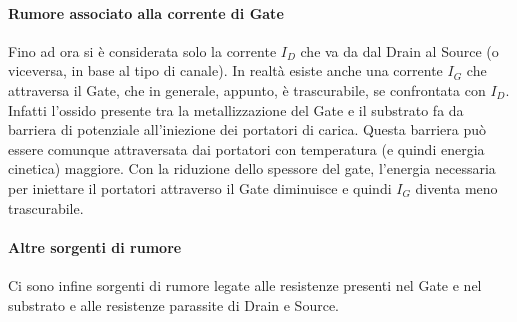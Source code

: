 \paragraph*{Rumore associato alla corrente di Gate}
Fino ad ora si è considerata solo la corrente $I_D$ che va da dal Drain al Source (o viceversa, in base al tipo di canale). In realtà esiste anche una corrente $I_G$ che attraversa il Gate, che in generale, appunto, è trascurabile, se confrontata con  $I_D$. Infatti l'ossido presente tra la metallizzazione del Gate e il substrato fa da barriera di potenziale all'iniezione dei portatori di carica. Questa barriera può essere comunque attraversata dai portatori con temperatura (e quindi energia cinetica) maggiore. Con la riduzione dello spessore del gate, l'energia necessaria per iniettare il portatori attraverso il Gate diminuisce e quindi $I_G$ diventa meno trascurabile.

\paragraph*{Altre sorgenti di rumore}
Ci sono infine sorgenti di rumore legate alle resistenze presenti nel Gate e nel substrato e alle resistenze parassite di Drain e Source.